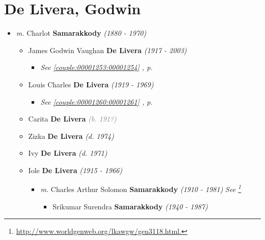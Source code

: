 \documentclass[10pt, openany]{book}
\begin{document}
\chapter{De Livera, Godwin}
\label{00001232}
\textcolor{slmaroon}{\textit{}}
\begin{itemize}
\item{\textit{m.} Charlot \textbf{Samarakkody} \textcolor{slorange}{\textit{(1880 - 1970)}}   \label{couple:00001232:00001233} \begin{itemize}
\item{James Godwin Vaughan \textbf{De Livera} \textcolor{slorange}{\textit{(1917 - 2003)}}
\begin{itemize}
\item{\textcolor{slteal}{\textit{See  \autoref{couple:00001253:00001254} \textit{, p. \pageref{couple:00001253:00001254} }}}}
\end{itemize}
    }
\item{Louis Charles  \textbf{De Livera} \textcolor{slorange}{\textit{(1919 - 1969)}}
\begin{itemize}
\item{\textcolor{slteal}{\textit{See  \autoref{couple:00001260:00001261} \textit{, p. \pageref{couple:00001260:00001261} }}}}
\end{itemize}
    }
\item{Carita \textbf{De Livera} \textcolor{gray}{\textit{(b. 191?)}}
  }
\item{Zizka \textbf{De Livera} \textcolor{slorange}{\textit{(d. 1974)}}
  }
\item{Ivy \textbf{De Livera} \textcolor{slorange}{\textit{(d. 1971)}}
  }
\item{Iole \textbf{De Livera} \textcolor{slorange}{\textit{(1915 - 1966)}}
\begin{itemize}
\item{\textit{m.} Charles Arthur Solomon \textbf{Samarakkody} \textcolor{slorange}{\textit{(1910 - 1981)}} \textcolor{slmaroon}{\textit{See \footnote{\url{http://www.worldgenweb.org/lkawgw/gen3118.html.}}}}   \label{couple:00001236:00001237} \begin{itemize}
\item{Srikumar Surendra \textbf{Samarakkody} \textcolor{slorange}{\textit{(1940 - 1987)}}
  }

\end{itemize}}
\end{itemize}}
\end{itemize}}
\end{itemize}
\end{document}
